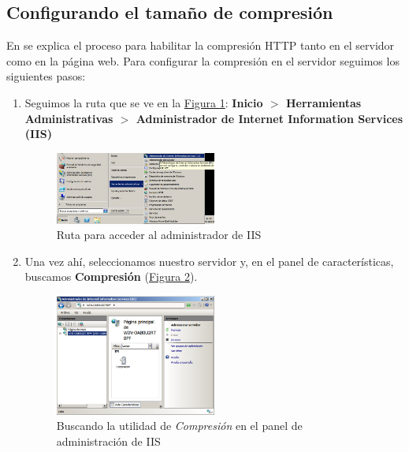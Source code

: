 \documentclass[10pt,a4paper,spanish]{article}
\numberwithin{equation}{section} %
\numberwithin{figure}{section} %
\numberwithin{table}{section} %
\begin{document}
\subsection{Configurando el tamaño de compresión}
En \cite{compiis} se explica el proceso para habilitar la compresión HTTP tanto en el servidor como en la página web. Para configurar la compresión en el servidor seguimos los siguientes pasos:
\begin{enumerate}[1.]
    \item Seguimos la ruta que se ve en la \hyperref[rutamaniis]{Figura \ref*{rutamaniis}}: \textbf{Inicio $>$ Herramientas Administrativas $>$ Administrador de Internet Information Services (IIS)}
    \begin{figure}[!h]
        \centering
        \includegraphics[width=0.5\textwidth]{20}
        \caption{Ruta para acceder al administrador de IIS}
        \label{rutamaniis}
    \end{figure}

    \item Una vez ahí, seleccionamos nuestro servidor y, en el panel de características, buscamos \textbf{Compresión} (\hyperref[searchcomp]{Figura \ref*{searchcomp}}).
    \begin{figure}[!h]
        \centering
        \includegraphics[width=0.5\textwidth]{21}
        \caption{Buscando la utilidad de \textit{Compresión} en el panel de administración de IIS}
        \label{searchcomp}
    \end{figure}


\end{enumerate}
\end{document}
